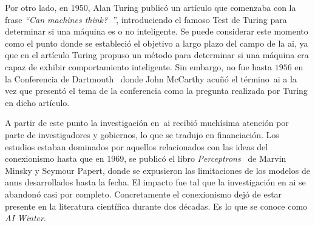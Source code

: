Por otro lado, en 1950, Alan Turing publicó un artículo que comenzaba con la frase \textit{\enquote{Can machines think?~\cite{turing1950computing}}}, introduciendo el famoso Test de Turing para determinar si una máquina es o no inteligente. Se puede considerar este momento como el punto donde se estableció el objetivo a largo plazo del campo de la \ac{ai}, ya que en el artículo Turing propuso un método para determinar si una máquina era capaz de exhibir comportamiento inteligente. Sin embargo, no fue hasta $1956$ en la Conferencia de Dartmouth~\cite{mccarthy1956dartmouth} donde John McCarthy acuñó el término~\ac{ai} a la vez que presentó el tema de la conferencia como la pregunta realizada por Turing en dicho artículo.

A partir de este punto la investigación en~\ac{ai} recibió muchísima atención por parte de investigadores y gobiernos, lo que se tradujo en financiación. Los estudios estaban dominados por aquellos relacionados con las ideas del conexionismo hasta que en $1969$, se publicó el libro \textit{Perceptrons}~\cite{minsky1969perceptrons} de Marvin Minsky y Seymour Papert, donde se expusieron las limitaciones de los modelos de \acp{ann} desarrollados hasta la fecha. El impacto fue tal que la investigación en \gls{ai} se abandonó casi por completo. Concretamente el conexionismo dejó de estar presente en la literatura científica durante dos décadas. Es lo que se conoce como \textit{AI Winter}.

